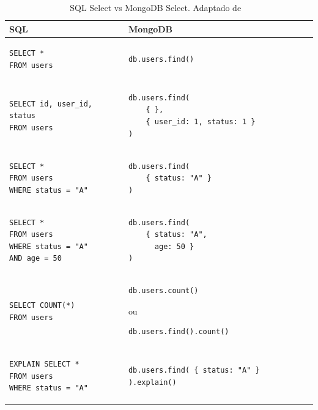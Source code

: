 \begin{table}[h]
	\caption{SQL Select vs MongoDB Select. Adaptado de ~\cite{sitemongodb}}
	\begin{center}
	\begin{tabular}{  l   p{8cm} }
		\hline
			\textbf{SQL} & \textbf{MongoDB} \\
		\hline
\lstset{language=SQL}
\begin{lstlisting}
SELECT *
FROM users
\end{lstlisting}
 &
\lstset{language=Java}
\begin{lstlisting}
db.users.find()
\end{lstlisting}
\\ \hline
\lstset{language=SQL}
\begin{lstlisting}
SELECT id, user_id, status
FROM users
\end{lstlisting}
 &
\lstset{language=Java}
\begin{lstlisting}
db.users.find(
    { },
    { user_id: 1, status: 1 }
)
\end{lstlisting}
\\ \hline
\lstset{language=SQL}
\begin{lstlisting}
SELECT *
FROM users
WHERE status = "A"
\end{lstlisting}
&
\lstset{language=Java}
\begin{lstlisting}
db.users.find(
    { status: "A" }
)
\end{lstlisting}
\\ \hline
\lstset{language=SQL}
\begin{lstlisting}
SELECT *
FROM users
WHERE status = "A"
AND age = 50
\end{lstlisting}
&
\lstset{language=Java}
\begin{lstlisting}
db.users.find(
    { status: "A",
      age: 50 }
)
\end{lstlisting}
\\ \hline
\lstset{language=SQL}
\begin{lstlisting}
SELECT COUNT(*)
FROM users
\end{lstlisting}
&
\lstset{language=Java}
\begin{lstlisting}
db.users.count()
\end{lstlisting}

ou

\begin{lstlisting}
db.users.find().count()
\end{lstlisting}
\\ \hline
\lstset{language=SQL}
\begin{lstlisting}
EXPLAIN SELECT *
FROM users
WHERE status = "A"
\end{lstlisting}
&
\lstset{language=Java}
\begin{lstlisting}
db.users.find( { status: "A" } ).explain()
\end{lstlisting}
\\ \hline
	\end {tabular}
	\end{center}
	\label{tab:sqlvsmongoselect}
\end{table}



